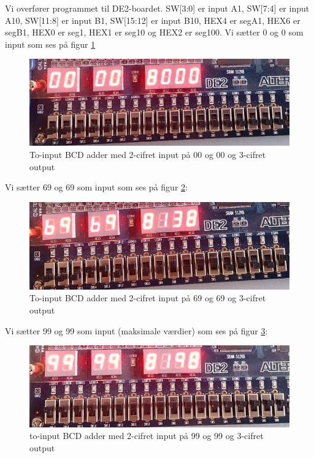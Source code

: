 \begin{enumerate}
Vi overfører programmet til DE2-boardet. SW[3:0] er input A1, SW[7:4] er input A10, SW[11:8] er input B1, SW[15:12] er input B10, HEX4 er segA1, HEX6 er segB1, HEX0 er seg1, HEX1 er seg10 og HEX2 er seg100. Vi sætter 0 og 0 som input som ses på figur \ref{fig:BCD_2seg_adder_0}
\begin{figure}[h]
	\centering
	\includegraphics[scale=0.6]{pictures/Oevelse4/BCD_adder/BCD_2seg_adder_0.jpg}
	\caption{To-input BCD adder med 2-cifret input på 00 og 00 og 3-cifret output}
	\label{fig:BCD_2seg_adder_0}
\end{figure}
Vi sætter 69 og 69 som input som ses på figur \ref{fig:BCD_2seg_adder_138}:
\begin{figure}[h]
	\centering
	\includegraphics[scale=0.6]{pictures/Oevelse4/BCD_adder/BCD_2seg_adder_138.jpg}
	\caption{To-input BCD adder med 2-cifret input på 69 og 69 og 3-cifret output}
	\label{fig:BCD_2seg_adder_138}
\end{figure}
Vi sætter 99 og 99 som input (maksimale værdier) som ses på figur \ref{fig:BCD_2seg_adder_198}:
\begin{figure}[h]
	\centering
	\includegraphics[scale=0.6]{pictures/Oevelse4/BCD_adder/BCD_2seg_adder_198.jpg}
	\caption{to-input BCD adder med 2-cifret input på 99 og 99 og 3-cifret output}
	\label{fig:BCD_2seg_adder_198}
\end{figure}
\end{enumerate}